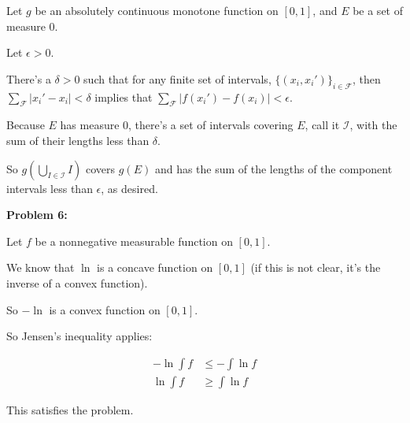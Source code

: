 \documentclass[a4paper,12pt]{article}
\newcommand{\shunt}{\vspace{20mm}}
\newcommand{\absval}[1]{\left\lvert #1 \right\rvert}
\newcommand{\de}{\delta}
\newcommand{\ep}{\epsilon}
\newcommand{\scrF}{\mathcal{F}}
\newcommand{\scrI}{\mathcal{I}}
\begin{document}
Let $g$ be an absolutely continuous monotone function on $[0,1]$, and $E$ be a set of measure $0$.

Let $\ep>0$.

There's a $\de>0$ such that for any finite set of intervals, $\{(x_i,x_i')\}_{i \in \scrF}$, then $\sum\limits_{\scrF} \absval{x_i' - x_i} < \de$ implies that $\sum\limits_{\scrF} \absval{f(x_i') - f(x_i)} < \ep$.

Because $E$ has measure $0$, there's a set of intervals covering $E$, call it $\scrI$, with the sum of their lengths less than $\de$.

So $g(\bigcup\limits_{I \in \scrI} I)$ covers $g(E)$ and has the sum of the lengths of the component intervals less than $\ep$, as desired.

\shunt

{\bf Problem 6:} 

Let $f$ be a nonnegative measurable function on $[0,1]$.

We know that $\ln$ is a concave function on $[0,1]$ (if this is not clear, it's the inverse of a convex function).

So $-\ln$ is a convex function on $[0,1]$.

So Jensen's inequality applies:

\begin{align*}
-\ln \int f &\leq -\int\ln f \\
\ln \int f & \geq \int \ln f
\end{align*}

This satisfies the problem.

\shunt
\end{document}
